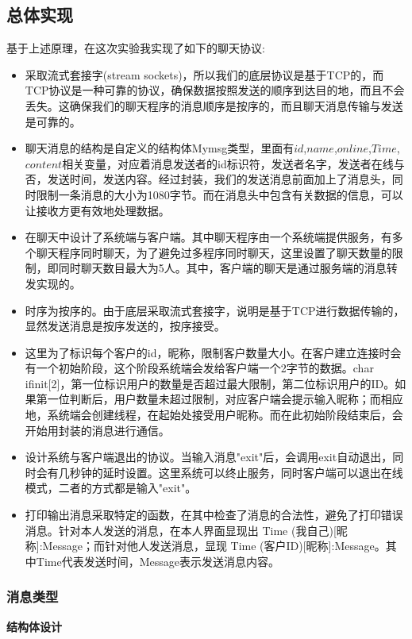\documentclass[12pt]{article}
\begin{document}
\subsection{总体实现}
基于上述原理，在这次实验我实现了如下的聊天协议:
\begin{itemize}
    \item 采取流式套接字(stream sockets)，所以我们的底层协议是基于TCP的，而TCP协议是一种可靠的协议，确保数据按照发送的顺序到达目的地，而且不会丢失。这确保我们的聊天程序的消息顺序是按序的，而且聊天消息传输与发送是可靠的。
    \item 聊天消息的结构是自定义的结构体Mymsg类型，里面有$id$,$name$,$online$,$Time$,$content$相关变量，对应着消息发送者的id标识符，发送者名字，发送者在线与否，发送时间，发送内容。经过封装，我们的发送消息前面加上了消息头，同时限制一条消息的大小为1080字节。而在消息头中包含有关数据的信息，可以让接收方更有效地处理数据。
    \item 在聊天中设计了系统端与客户端。其中聊天程序由一个系统端提供服务，有多个聊天程序同时聊天，为了避免过多程序同时聊天，这里设置了聊天数量的限制，即同时聊天数目最大为5人。其中，客户端的聊天是通过服务端的消息转发实现的。
    \item 时序为按序的。由于底层采取流式套接字，说明是基于TCP进行数据传输的，显然发送消息是按序发送的，按序接受。
    \item 这里为了标识每个客户的id，昵称，限制客户数量大小。在客户建立连接时会有一个初始阶段，这个阶段系统端会发给客户端一个2字节的数据。char ifinit[2]，第一位标识用户的数量是否超过最大限制，第二位标识用户的ID。如果第一位判断后，用户数量未超过限制，对应客户端会提示输入昵称；而相应地，系统端会创建线程，在起始处接受用户昵称。而在此初始阶段结束后，会开始用封装的消息进行通信。
    \item 设计系统与客户端退出的协议。当输入消息"exit"后，会调用exit自动退出，同时会有几秒钟的延时设置。这里系统可以终止服务，同时客户端可以退出在线模式，二者的方式都是输入"exit"。
    \item 打印输出消息采取特定的函数，在其中检查了消息的合法性，避免了打印错误消息。针对本人发送的消息，在本人界面显现出 Time (我自己)[昵称]:Message；而针对他人发送消息，显现 Time (客户ID)[昵称]:Message。其中Time代表发送时间，Message表示发送消息内容。
\end{itemize}
\subsubsection{消息类型}
\textbf{\large{结构体设计}}
\end{document}

